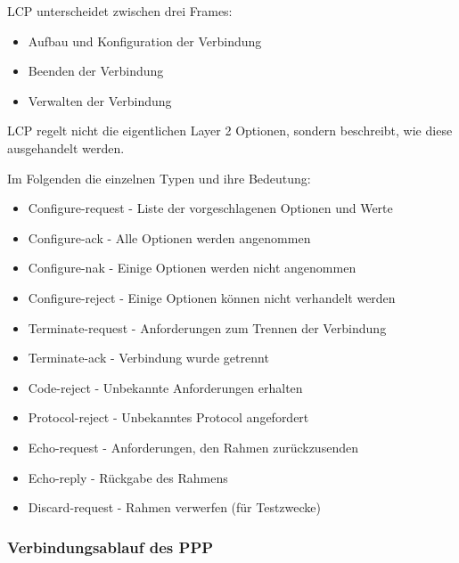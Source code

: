 \documentclass[12pt, a4paper, ngerman]{article}
\begin{document}
LCP unterscheidet zwischen drei Frames: 

\begin{itemize}
	\item Aufbau und Konfiguration der Verbindung
	\item Beenden der Verbindung
	\item Verwalten der Verbindung
\end{itemize}

LCP regelt nicht die eigentlichen Layer 2 Optionen, sondern beschreibt, wie diese ausgehandelt werden. 

Im Folgenden die einzelnen Typen und ihre Bedeutung:

\begin{itemize}
	\item Configure-request	- Liste der vorgeschlagenen Optionen und Werte
	\item Configure-ack		- Alle Optionen werden angenommen
	\item	Configure-nak		- Einige Optionen werden nicht angenommen
	\item Configure-reject	- Einige Optionen können nicht verhandelt werden
	\item Terminate-request	- Anforderungen zum Trennen der Verbindung
	\item Terminate-ack		- Verbindung wurde getrennt
	\item Code-reject		- Unbekannte Anforderungen erhalten
	\item Protocol-reject		- Unbekanntes Protocol angefordert
	\item Echo-request		- Anforderungen, den Rahmen zurückzusenden
	\item Echo-reply		- Rückgabe des Rahmens
	\item	Discard-request	- Rahmen verwerfen (für Testzwecke)
\end{itemize} 



\subsubsection{Verbindungsablauf des PPP}
\end{document}
